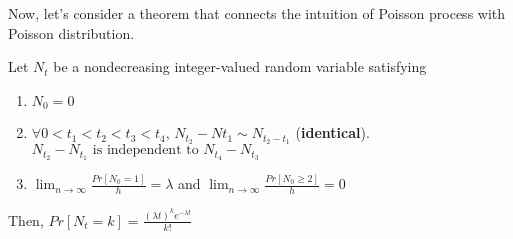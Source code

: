 \documentclass[../Distributions.tex]{subfiles}
\begin{document}
\noindent Now, let's consider a theorem that connects the intuition of Poisson process with Poisson distribution.
\begin{theorem}
	Let $N_t$ be a nondecreasing integer-valued random variable satisfying
	\begin{enumerate}
		\item $N_0=0$
		\item $\forall0<t_1<t_2<t_3<t_4$, $N_{t_2}-N{t_1}\sim N_{t_2-t_1}$ ({\bf identical}). $N_{t_2} - N_{t_1} \mbox{ is independent to } N_{t_4} - N_{t_3}$
		\item $\lim_{n\rightarrow\infty}\frac{Pr[N_0=1]}{h} = \lambda$ and $\lim_{n\rightarrow\infty}\frac{Pr[N_0\geq2]}{h}=0$
	\end{enumerate}
	Then, $Pr[N_t=k] = \frac{(\lambda t)^ke^{-\lambda t}}{k!}$
\end{theorem}
\end{document}
